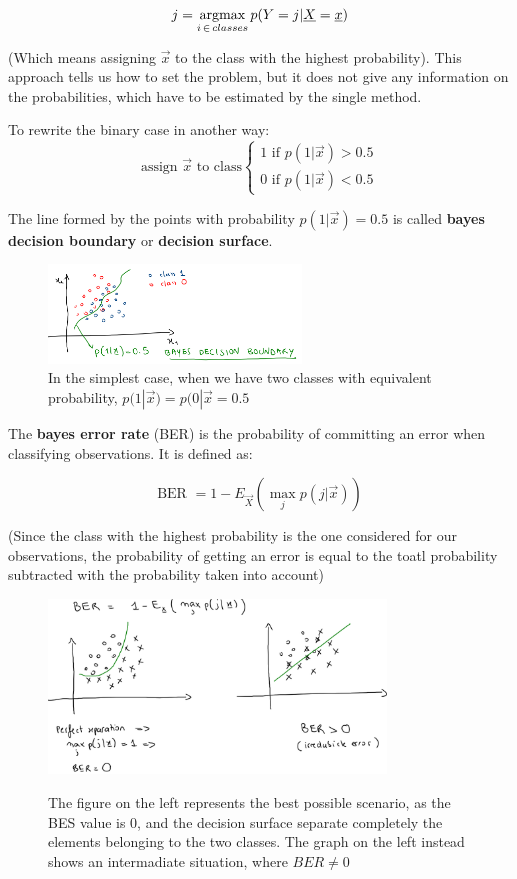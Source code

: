     $$j = \operatorname*{argmax}_{i\,\in\,classes} p(Y = j|\underline{X} = \underline{x})$$

    (Which means assigning $\vec{x}$ to the class with the highest probability).
    This approach tells us how to set the problem, but it does not give any information on the probabilities, which have to be estimated by the single method.

    To rewrite the binary case in another way:
    $$
    \text{assign } \vec{x} \text{ to class} 
    \begin{cases}
      1 \text{ if } p(1|\vec{x}) > 0.5\\
      0 \text{ if } p(1|\vec{x}) < 0.5
    \end{cases}
    $$
    
    The line formed by the points with probability $p(1|\vec{x}) = 0.5$ is called \textbf{bayes decision boundary} or \textbf{decision surface}.
    
\begin{figure}[h]
\centering
\caption{In the simplest case, when we have two classes with equivalent probability, $ p(1 | \vec{x}) = p(0 | \vec{x} = 0.5 $}
\includegraphics[width=0.6\textwidth]{BayesDecisionBoundary}
\end{figure}

    The \textbf{bayes error rate} (BER) is the probability of committing an error when classifying observations. It is defined as:
    
    $$\text{BER } = 1 - E_{\vec{X}}\left(\max_{j} p(j|\vec{x})\right)$$
    
(Since the class with the highest probability is the one considered for our observations, the probability of getting an error is equal to the toatl probability subtracted with the probability taken into account)

\begin{figure}[h]
\caption{The figure on the left represents the best possible scenario, as the BES value is 0, and the decision surface separate completely the elements belonging to the two classes. The graph on the left instead shows an intermadiate situation, where $ BER \neq 0 $}
\centering
\includegraphics[width=0.8\textwidth]{BERBayesErrorRate}
\label{BER}
\end{figure}

